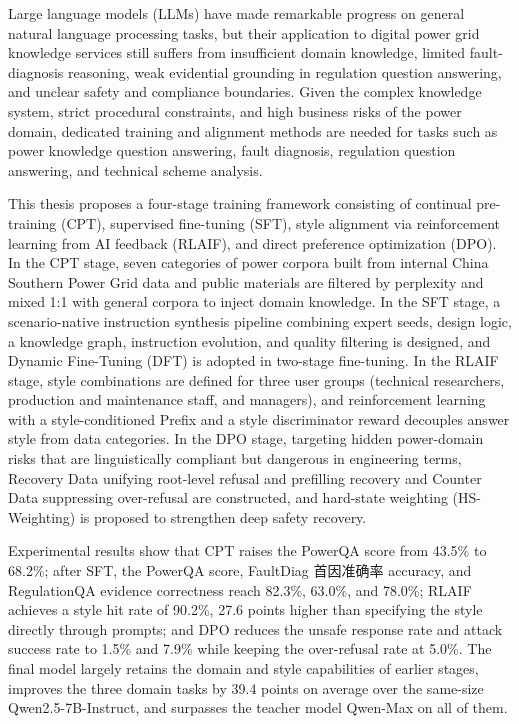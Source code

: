 \documentclass[fontset=fandol,type=master,campus=shenzhen,etitleauto=true]{hithesisbook}
\begin{document}
\begin{eabstract}
Large language models (LLMs) have made remarkable progress on general natural language processing tasks, but their application to digital power grid knowledge services still suffers from insufficient domain knowledge, limited fault-diagnosis reasoning, weak evidential grounding in regulation question answering, and unclear safety and compliance boundaries. Given the complex knowledge system, strict procedural constraints, and high business risks of the power domain, dedicated training and alignment methods are needed for tasks such as power knowledge question answering, fault diagnosis, regulation question answering, and technical scheme analysis.

This thesis proposes a four-stage training framework consisting of continual pre-training (CPT), supervised fine-tuning (SFT), style alignment via reinforcement learning from AI feedback (RLAIF), and direct preference optimization (DPO). In the CPT stage, seven categories of power corpora built from internal China Southern Power Grid data and public materials are filtered by perplexity and mixed 1:1 with general corpora to inject domain knowledge. In the SFT stage, a scenario-native instruction synthesis pipeline combining expert seeds, design logic, a knowledge graph, instruction evolution, and quality filtering is designed, and Dynamic Fine-Tuning (DFT) is adopted in two-stage fine-tuning. In the RLAIF stage, style combinations are defined for three user groups (technical researchers, production and maintenance staff, and managers), and reinforcement learning with a style-conditioned Prefix and a style discriminator reward decouples answer style from data categories. In the DPO stage, targeting hidden power-domain risks that are linguistically compliant but dangerous in engineering terms, Recovery Data unifying root-level refusal and prefilling recovery and Counter Data suppressing over-refusal are constructed, and hard-state weighting (HS-Weighting) is proposed to strengthen deep safety recovery.

Experimental results show that CPT raises the PowerQA score from 43.5\% to 68.2\%; after SFT, the PowerQA score, FaultDiag 首因准确率 accuracy, and RegulationQA evidence correctness reach 82.3\%, 63.0\%, and 78.0\%; RLAIF achieves a style hit rate of 90.2\%, 27.6 points higher than specifying the style directly through prompts; and DPO reduces the unsafe response rate and attack success rate to 1.5\% and 7.9\% while keeping the over-refusal rate at 5.0\%. The final model largely retains the domain and style capabilities of earlier stages, improves the three domain tasks by 39.4 points on average over the same-size Qwen2.5-7B-Instruct, and surpasses the teacher model Qwen-Max on all of them.
\end{eabstract}
\end{document}
